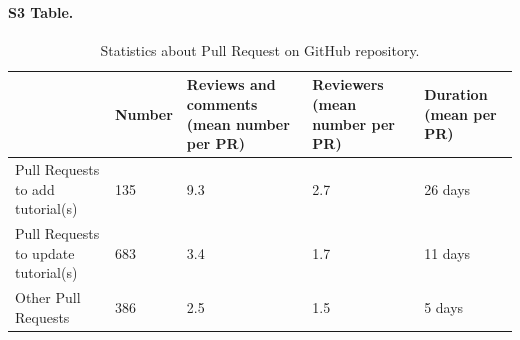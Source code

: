 \documentclass[10pt,letterpaper]{article}
\begin{document}
\paragraph*{S3 Table.}
\label{S3_Table}
\begin{table}[]
\begin{adjustwidth}{-2.25in}{0in} %
	\centering
	\caption{Statistics about Pull Request on GitHub repository.\label{tbl:pullRequestReviewing}}
	\begin{tabular}{l|p{}p{}p{}p{}}
									        & Number & Reviews and comments (mean number per PR) & Reviewers (mean number per PR) & Duration (mean per PR) \\\hline
		Pull Requests to add tutorial(s)    & 135    & 9.3                                       & 2.7                            & 26 days\\
		Pull Requests to update tutorial(s) & 683    & 3.4                                       & 1.7                            & 11 days\\
		Other Pull Requests                 & 386    & 2.5                                       & 1.5                            & 5 days\\
	\end{tabular}
\end{adjustwidth}
\end{table}
\end{document}
